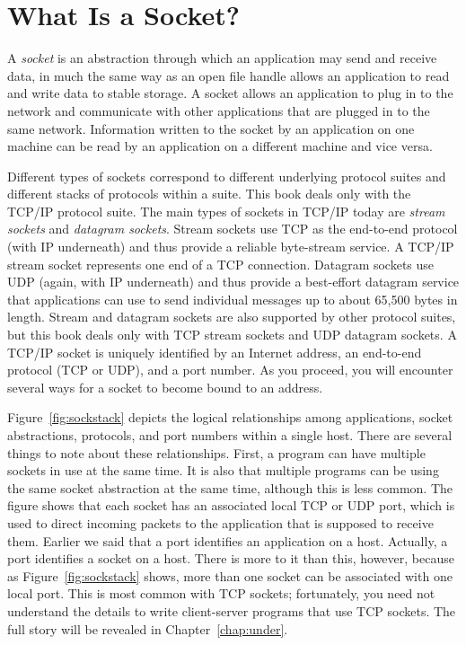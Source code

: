 \section{What Is a Socket?}

A \emph{socket} is an abstraction through which an application may
send and receive data, in much the same way as an open file handle
allows an application to read and write data to stable storage.  A
socket allows an application to plug in to the network and communicate
with other applications that are plugged in to the same
network. Information written to the socket by an application on one
machine can be read by an application on a different machine and vice
versa.

Different types of sockets correspond to different underlying protocol
suites and different stacks of protocols within a suite.  This book
deals only with the TCP/IP protocol suite.  The main types of sockets
in TCP/IP today are \emph{stream sockets} and \emph{datagram sockets}.
Stream sockets use TCP as the end-to-end protocol (with IP underneath)
and thus provide a reliable byte-stream service.  A TCP/IP stream
socket represents one end of a TCP connection.  Datagram sockets use
UDP (again, with IP underneath) and thus provide a best-effort
datagram service that applications can use to send individual messages
up to about 65,500 bytes in length.  Stream and datagram sockets are
also supported by other protocol suites, but
 this book deals only with TCP stream sockets and UDP datagram
sockets.  A TCP/IP socket is uniquely identified by an Internet
address, an end-to-end protocol (TCP or UDP), and a port number.  As
you proceed, you will encounter several ways for a socket to become
bound to an address.

Figure~\ref{fig:sockstack} depicts the logical relationships among
applications, socket abstractions, protocols, and port numbers within
a single host.  There are several things to note about these
relationships.  First, a program can have multiple sockets in use
at the same time.  It is also that multiple programs can be using the
same socket abstraction at the same time, although this is less common.
The figure shows that each socket has an associated local TCP or UDP port,
which is used to direct incoming packets to the application that is
supposed to receive them.
Earlier we said that a port identifies an application on a host.
Actually, a port identifies a socket on a host.  
There is more to it than this, however,
because as Figure~\ref{fig:sockstack} shows, more than one socket can
be associated with one local port.  This is most common with TCP
sockets; fortunately, you need not understand the details to write
client-server programs that use TCP sockets.  The full story will be
revealed in Chapter~\ref{chap:under}.


